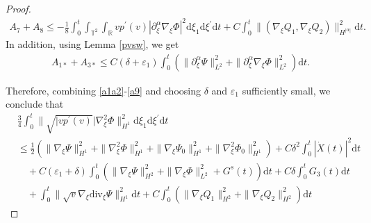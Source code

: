 \documentclass[10pt,a4paper]{amsart}
\newcommand{\ddiv}{\mathrm{div}}
\newcommand{\dif}{\mathrm{d}}
\begin{document}
\begin{proof}
\begin{equation}
\begin{aligned}
A_7+A_8\le-\frac{1}{8}\int_0^t\int_{\mathbb{T}^2}\int_{\mathbb{R}}vp^\prime(v)|\partial_\xi^\alpha\nabla_\xi\Phi|^2
\dif \xi_1\dif \xi^{\prime}\dif t+C\int_0^t\|(\nabla_\xi Q_1, \nabla_\xi Q_2)\|_{H^{|\alpha|}}^2\dif t
.
\end{aligned}
\end{equation}
In addition, using Lemma \ref{pvsw}, we get
\begin{equation}\label{a9}
\begin{aligned}
A_{1\ast}+A_{3\ast}\le C(\delta+\varepsilon_1)\int_0^t\left(\|\partial_\xi^\alpha\Psi\|_{L^2}^2+\|\partial_\xi^\alpha\nabla_\xi\Phi\|_{L^2}^2\right)
\dif t.
\end{aligned}
\end{equation}

Therefore, combining \eqref{a1a2}-\eqref{a9} and choosing $\delta$ and $\varepsilon_1$ sufficiently small, we conclude that
\begin{equation}\label{gjhsgj3}
\begin{aligned}
&\frac{3}{4}\int_0^t\|\sqrt{|vp^\prime(v)}|\nabla_\xi^2\Phi\|_{H^1}^2
\dif \xi_1\dif \xi^{\prime}\dif t\\
&\le \frac{1}{2}\left(\|\nabla_\xi\Psi\|_{H^1}^2+\|\nabla_\xi^2\Phi\|_{H^1}^2
+\|\nabla_\xi\Psi_0\|_{H^1}^2+\|\nabla_\xi^2\Phi_0\|_{H^1}^2\right)
+C\delta^2\int_0^t|\dot X(t)|^2\dif t\\
&\quad
+C(\varepsilon_1+\delta)\int_0^t\left(\|\nabla_\xi\Psi\|_{H^2}^2+\|\nabla_\xi\Phi\|_{L^2}^2
+G^s(t)\right)\dif t
+C\delta\int_0^t
G_3(t)\dif t
\\
&\quad+\int_0^t\|
\sqrt{v}\nabla_\xi\ddiv_\xi\Psi\|_{H^1}^2
\dif t+C\int_0^t\left(\|\nabla_\xi Q_1\|_{H^2}^2+\|\nabla_\xi Q_2\|_{H^2}^2\right)
\dif t
\end{aligned}
\end{equation}


\end{proof}
\end{document}
